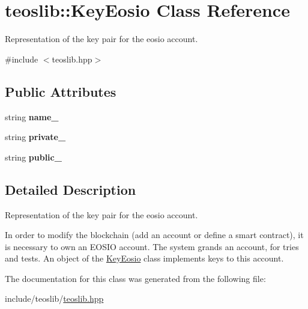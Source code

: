 \hypertarget{classteoslib_1_1_key_eosio}{}\section{teoslib\+:\+:Key\+Eosio Class Reference}
\label{classteoslib_1_1_key_eosio}


Representation of the key pair for the eosio account.  




{\ttfamily \#include $<$teoslib.\+hpp$>$}

\subsection*{Public Attributes}
\begin{DoxyCompactItemize}
\item 
\mbox{\label{classteoslib_1_1_key_eosio_a93b5e7301d06888400b17fef7fcf5d51}} 
string {\bfseries name\+\_\+}
\item 
\mbox{\label{classteoslib_1_1_key_eosio_a431a821c417f1171a281a0c6cc93cd40}} 
string {\bfseries private\+\_\+}
\item 
\mbox{\label{classteoslib_1_1_key_eosio_a5eb1eb0758e157d483d3ff427a943c43}} 
string {\bfseries public\+\_\+}
\end{DoxyCompactItemize}


\subsection{Detailed Description}
Representation of the key pair for the eosio account. 

In order to modify the blockchain (add an account or define a smart contract), it is necessary to own an E\+O\+S\+IO account. The system grands an account, for tries and tests. An object of the \mbox{\hyperlink{classteoslib_1_1_key_eosio}{Key\+Eosio}} class implements keys to this account. 

The documentation for this class was generated from the following file\+:\begin{DoxyCompactItemize}
\item 
include/teoslib/\mbox{\hyperlink{teoslib_8hpp}{teoslib.\+hpp}}\end{DoxyCompactItemize}
